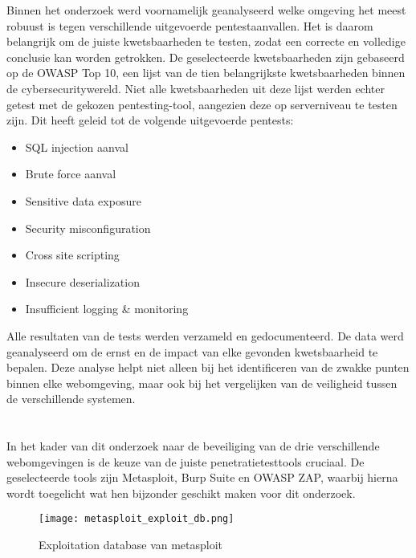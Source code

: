 Binnen het onderzoek werd voornamelijk geanalyseerd welke omgeving het meest robuust is tegen verschillende uitgevoerde pentestaanvallen. 
Het is daarom belangrijk om de juiste kwetsbaarheden te testen, zodat een correcte en volledige conclusie kan worden 
getrokken. De geselecteerde kwetsbaarheden zijn gebaseerd op de OWASP Top 10, een lijst van de tien belangrijkste 
kwetsbaarheden binnen de cybersecuritywereld. Niet alle kwetsbaarheden uit deze lijst werden echter getest met de 
gekozen pentesting-tool, aangezien deze op serverniveau te testen zijn. Dit heeft geleid tot de volgende uitgevoerde pentests:

\begin{itemize}
    \item SQL injection aanval
    \item Brute force aanval
    \item Sensitive data exposure
    \item Security misconfiguration
    \item Cross site scripting
    \item Insecure deserialization
    \item Insufficient logging \& monitoring 
\end{itemize}

Alle resultaten van de tests werden verzameld en gedocumenteerd. De data werd geanalyseerd 
om de ernst en de impact van elke gevonden kwetsbaarheid te bepalen. Deze analyse helpt niet alleen bij 
het identificeren van de zwakke punten binnen elke webomgeving, maar ook bij het vergelijken van de 
veiligheid tussen de verschillende systemen.

\section{}
In het kader van dit onderzoek naar de beveiliging van de drie verschillende webomgevingen is de keuze van 
de juiste penetratietesttools cruciaal. De geselecteerde tools zijn 
Metasploit, Burp Suite en OWASP ZAP, waarbij hierna wordt toegelicht wat hen bijzonder geschikt maken voor dit onderzoek.
\begin{figure}
    \centering
    \texttt{[image: metasploit\_exploit\_db.png]}
    \caption[Exploitation database van metasploit]{Exploitation database van metasploit}
    \label{fig:exploitatie_db}
\end{figure}
